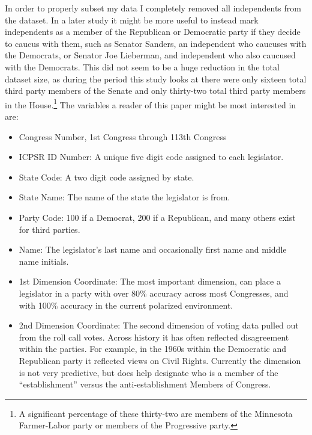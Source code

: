 \documentclass[12pt,twoside]{reedthesis}
\begin{document}
  In order to properly subset my data I completely removed all
  independents from the dataset. In a later study it might be more useful
  to instead mark independents as a member of the Republican or Democratic
  party if they decide to caucus with them, such as Senator Sanders, an
  independent who caucuses with the Democrats, or Senator Joe Lieberman,
  and independent who also caucused with the Democrats. This did not seem
  to be a huge reduction in the total dataset size, as during the period
  this study looks at there were only sixteen total third party members of
  the Senate and only thirty-two total third party members in the
  House.\footnote{A significant percentage of these thirty-two are members of the Minnesota Farmer-Labor party or members of the Progressive party.}
  The variables a reader of this paper might be most interested in are:
  
  \begin{itemize}
  \itemsep1pt\parskip0pt
  \item
    Congress Number, 1st Congress through 113th Congress
  \item
    ICPSR ID Number: A unique five digit code assigned to each legislator.
  \item
    State Code: A two digit code assigned by state.
  \item
    State Name: The name of the state the legislator is from.
  \item
    Party Code: 100 if a Democrat, 200 if a Republican, and many others
    exist for third parties.
  \item
    Name: The legislator's last name and occasionally first name and
    middle name initials.
  \item
    1st Dimension Coordinate: The most important dimension, can place a
    legislator in a party with over 80\% accuracy across most Congresses,
    and with 100\% accuracy in the current polarized environment.
  \item
    2nd Dimension Coordinate: The second dimension of voting data pulled
    out from the roll call votes. Across history it has often reflected
    disagreement within the parties. For example, in the 1960s within the
    Democratic and Republican party it reflected views on Civil Rights.
    Currently the dimension is not very predictive, but does help
    designate who is a member of the ``establishment'' versus the
    anti-establishment Members of Congress.
  \end{itemize}
  
\end{document}
